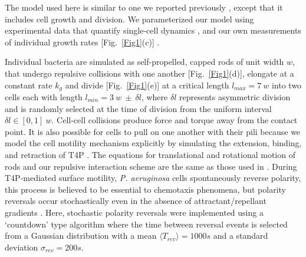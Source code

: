 \documentclass[aps,prl,numerical,reprint,superscriptaddress,showpacs]{revtex4-1}
\begin{document}
The model used here is similar to one we reported previously \cite{zachreson2016emergent}, except that it includes cell growth and division.  We parameterized our model using experimental data that quantify single-cell dynamics \cite{skerker2001direct}, and our own measurements of individual growth rates [Fig.~\ref{Fig1}(c)] \cite{Supp}. 



Individual bacteria are simulated as self-propelled, capped rods of unit width $w$, that undergo repulsive collisions with one another [Fig.~\ref{Fig1}(d)], elongate at a constant rate $k_g$ and divide [Fig.~\ref{Fig1}(e)] at a critical length $l_{max} = 7~w$ into two cells each with length $l_{min} = 3~w~ \pm ~  \delta l $, where $\delta l$ represents asymmetric division and is randomly selected at the time of division from the uniform interval $\delta l \in [0, 1]~w$. Cell-cell collisions produce force and torque away from the contact point. It is also possible for cells to pull on one another with their pili because we model the cell motility mechanism explicitly \cite{zachreson2016emergent} by simulating the extension, binding, and retraction of T4P \cite{mattick2002type}. The equations for translational and rotational motion of rods and our repulsive interaction scheme are the same as those used in \cite{farrell2013mechanically,ghosh2015mechanically,zachreson2016emergent}. During T4P-mediated surface motility, {\it{P. aeruginosa}} cells spontaneously reverse polarity, this process is believed to be essential to chemotaxis phenomena, but polarity reversals occur stochastically even in the absence of attractant/repellant gradients \cite{oliveira2016single}. Here, stochastic polarity reversals were implemented using a `countdown' type algorithm where the time between reversal events is selected from a Gaussian distribution with a mean $\langle T_{rev} \rangle= 1000 s$ and a standard deviation $\sigma_{rev} = 200s$. 
\end{document}
